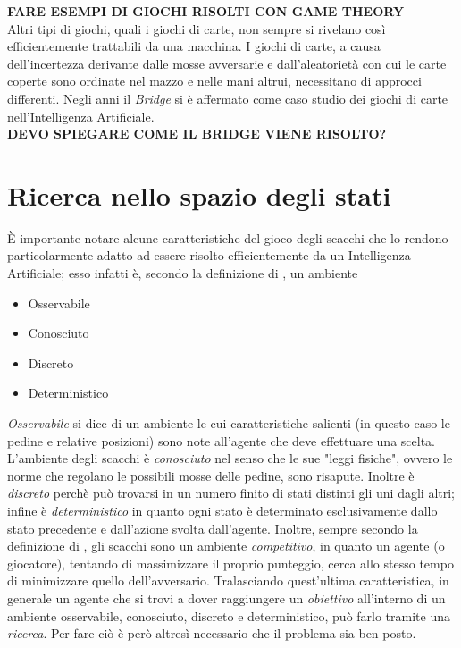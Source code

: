 \textbf{FARE ESEMPI DI GIOCHI RISOLTI CON GAME THEORY}\\



Altri tipi di giochi, quali i giochi di carte, non sempre si rivelano così efficientemente trattabili da una macchina.
I giochi di carte, a causa dell'incertezza derivante dalle mosse avversarie e dall'aleatorietà con cui le carte coperte sono ordinate nel mazzo e nelle mani altrui, necessitano di approcci differenti.
Negli anni il \emph{Bridge} si è affermato come caso studio dei giochi di carte nell'Intelligenza Artificiale.\\




\textbf{DEVO SPIEGARE COME IL BRIDGE VIENE RISOLTO?}\\




\section{Ricerca nello spazio degli stati}


È importante notare alcune caratteristiche del gioco degli scacchi che lo rendono particolarmente adatto ad essere risolto efficientemente da un Intelligenza Artificiale; esso infatti è, secondo la definizione di \cite{randw}, un ambiente
\begin{itemize}
   \item Osservabile
   \item Conosciuto
   \item Discreto
   \item Deterministico
\end{itemize}
\emph{Osservabile} si dice di un ambiente le cui caratteristiche salienti (in questo caso le pedine e relative posizioni) sono note all'agente che deve effettuare una scelta.
L'ambiente degli scacchi è \emph{conosciuto} nel senso che le sue "leggi fisiche", ovvero le norme che regolano le possibili mosse delle pedine, sono risapute.
Inoltre è \emph{discreto} perchè può trovarsi in un numero finito di stati distinti gli uni dagli altri; infine è \emph{deterministico} in quanto ogni stato è determinato esclusivamente dallo stato precedente e dall'azione svolta dall'agente.
Inoltre, sempre secondo la definizione di \cite{randw}, gli scacchi sono un ambiente \emph{competitivo}, in quanto un agente (o giocatore), tentando di massimizzare il proprio punteggio, cerca allo stesso tempo di minimizzare quello dell'avversario.
Tralasciando quest'ultima caratteristica, in generale un agente che si trovi a dover raggiungere un \emph{obiettivo} all'interno di un ambiente osservabile, conosciuto, discreto e deterministico, può farlo tramite una \emph{ricerca}.
Per fare ciò è però altresì necessario che il problema sia ben posto.

